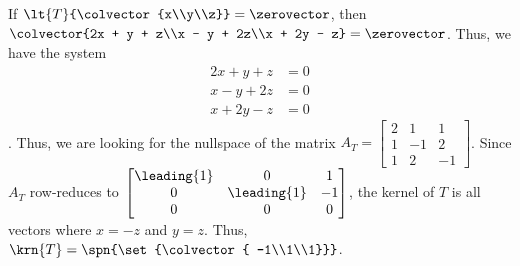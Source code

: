If $\lt{T}{\colvector{x\\y\\z}} = \zerovector$, then $\colvector{2x + y + z\\x - y + 2z\\x + 2y - z} = \zerovector$.  Thus, we have the system 
\begin{align*}
2x + y + z &= 0\\
x - y + 2z &= 0\\
x + 2y - z &= 0
\end{align*}.  
Thus, we are looking for the nullspace of the matrix 
$A_T = 
\begin{bmatrix} 
2& 1 & 1\\ 
1 & -1 & 2\\
1 & 2 & -1
\end{bmatrix}$.  
Since $A_T$ row-reduces to 
$\begin{bmatrix} 
\leading{1} & 0 & 1\\ 
0 & \leading{1} & -1 \\ 
0 & 0 & 0
\end{bmatrix}$, 
the kernel of $T$ is all vectors where $x = -z$ and $y = z$.  
Thus, $\krn{T} = \spn{\set{\colvector{ -1\\1\\1}}}$.